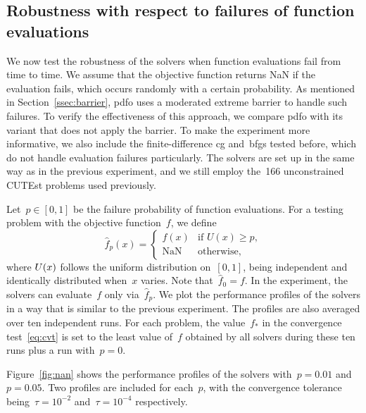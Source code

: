 \documentclass{article}
\numberwithin{equation}{section}
\theoremstyle{definition}
\theoremstyle{plain}
\theoremstyle{remark}
\newcommand{\iter}[1][k]{x\ifthenelse{\equal{#1}{}}{}{_{#1}}}
\newcommand{\obj}{f}
\begin{document}
\subsection{Robustness with respect to failures of function evaluations}
\label{ssec:nan}

We now test the robustness of the solvers when function evaluations fail from time to time.
We assume that the objective function returns NaN if the evaluation fails, which occurs randomly with a certain probability.
As mentioned in Section~\ref{ssec:barrier}, \gls{pdfo} uses a moderated extreme barrier to handle such failures.
To verify the effectiveness of this approach, we compare \gls{pdfo} with its variant that does not apply the barrier.
To make the experiment more informative, we also include the finite-difference \gls{cg} and~\gls{bfgs} tested before, which do not handle evaluation failures particularly.
The solvers are set up in the same way as in the previous experiment, and we still employ the~\num{166} unconstrained CUTEst problems used previously.

Let~$p \in [0,1]$ be the failure probability of function evaluations.
For a testing problem with the objective function~$\obj$, we define
\begin{equation}
    \label{eq:nan-obj}
    \hat{\obj}_p(x) = \begin{cases}
        \obj(x)     & \text{if~$U(x) \ge p$},\\[0.5ex]
        \text{NaN}  & \text{otherwise},
    \end{cases}
\end{equation}
where $U(\iter[])$ follows the uniform distribution on~$[0,1]$, being independent and identically distributed when~$x$ varies.
Note that~$\hat{\obj}_0 = f$.
In the experiment, the solvers can evaluate~$\obj$ only via~$\hat{\obj}_p$.
We plot the performance profiles of the solvers in a way that is similar to the previous experiment.
The profiles are also averaged over ten independent runs.
For each problem, the value~$\obj_{\ast}$ in the convergence test~\eqref{eq:cvt} is set to the least value of~$\obj$ obtained by all solvers during these ten runs plus a run with~$p = 0$.

Figure~\ref{fig:nan} shows the performance profiles of the solvers with~$p = 0.01$ and~$p=0.05$.
Two profiles are included for each~$p$, with the convergence tolerance being~$\tau = 10^{-2}$ and~$\tau = 10^{-4}$ respectively.
\end{document}
